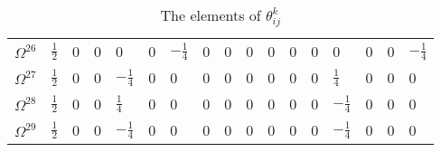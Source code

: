 \begin{tiny}
\begin{table}[]
\begin{tabular}{lllllllllllllllll}
            $\Omega^{26}$ & $\frac{1}{2}$	&	0	&	0	&	0	&	0	&	$-\frac{1}{4}$	&	0	&	0	&	0	&	0	&	0	&	0	&	0	&	0	&	0	&	$-\frac{1}{4}$ \\ 
            $\Omega^{27}$ & $\frac{1}{2}$	&	0	&	0	&	$-\frac{1}{4}$	&	0	&	0	&	0	&	0	&	0	&	0	&	0	&	0	&	$\frac{1}{4}$	&	0	&	0	&	0 \\ 
            $\Omega^{28}$ & $\frac{1}{2}$	&	0	&	0	&	$\frac{1}{4}$	&	0	&	0	&	0	&	0	&	0	&	0	&	0	&	0	&	$-\frac{1}{4}$	&	0	&	0	&	0 \\ 
            $\Omega^{29}$ & $\frac{1}{2}$	&	0	&	0	&	$-\frac{1}{4}$	&	0	&	0	&	0	&	0	&	0	&	0	&	0	&	0	&	$-\frac{1}{4}$	&	0	&	0	&	0 \\ 
        \end{tabular}
        \caption{The elements of $\theta_{ij}^{k}$}
        \end{table}
\end{tiny}
